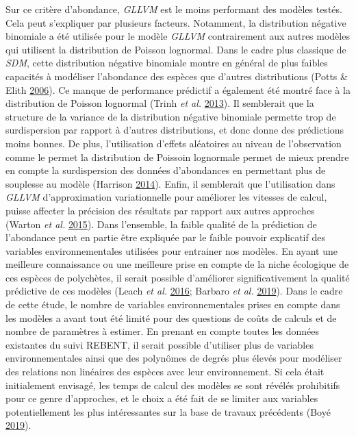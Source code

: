 \documentclass[12pt,]{article}
\begin{document}
Sur ce critère d'abondance, \emph{GLLVM} est le moins performant des
modèles testés. Cela peut s'expliquer par plusieurs facteurs. Notamment,
la distribution négative binomiale a été utilisée pour le modèle
\emph{GLLVM} contrairement aux autres modèles qui utilisent la
distribution de Poisson lognormal. Dans le cadre plus classique de
\emph{SDM}, cette distribution négative binomiale montre en général de
plus faibles capacités à modéliser l'abondance des espèces que d'autres
distributions (Potts \& Elith \protect\hyperlink{ref-Potts_2006}{2006}).
Ce manque de performance prédictif a également été montré face à la
distribution de Poisson lognormal (Trinh \emph{et al.}
\protect\hyperlink{ref-Trinh_2013}{2013}). Il semblerait que la
structure de la variance de la distribution négative binomiale permette
trop de surdispersion par rapport à d'autres distributions, et donc
donne des prédictions moins bonnes. De plus, l'utilisation d'effets
aléatoires au niveau de l'observation comme le permet la distribution de
Poissoin lognormale permet de mieux prendre en compte la surdispersion
des données d'abondances en permettant plus de souplesse au modèle
(Harrison \protect\hyperlink{ref-Harrison_2014}{2014}). Enfin, il
semblerait que l'utilisation dans \emph{GLLVM} d'approximation
variationnelle pour améliorer les vitesses de calcul, puisse affecter la
précision des résultats par rapport aux autres approches (Warton
\emph{et al.} \protect\hyperlink{ref-warton2015}{2015}). Dans
l'ensemble, la faible qualité de la prédiction de l'abondance peut en
partie être expliquée par le faible pouvoir explicatif des variables
environnementales utilisées pour entrainer nos modèles. En ayant une
meilleure connaissance ou une meilleure prise en compte de la niche
écologique de ces espèces de polychètes, il serait possible d'améliorer
significativement la qualité prédictive de ces modèles (Leach \emph{et
al.} \protect\hyperlink{ref-Leach_2016}{2016}; Barbaro \emph{et al.}
\protect\hyperlink{ref-Barbaro_2019}{2019}). Dans le cadre de cette
étude, le nombre de variables environnementales prises en compte dans
les modèles a avant tout été limité pour des questions de coûts de
calculs et de nombre de paramètres à estimer. En prenant en compte
toutes les données existantes du suivi REBENT, il serait possible
d'utiliser plus de variables environnementales ainsi que des polynômes
de degrés plus élevés pour modéliser des relations non linéaires des
espèces avec leur environnement. Si cela était initialement envisagé,
les temps de calcul des modèles se sont révélés prohibitifs pour ce
genre d'approches, et le choix a été fait de se limiter aux variables
potentiellement les plus intéressantes sur la base de travaux précédents
(Boyé \protect\hyperlink{ref-Boye_2019b}{2019}).
\end{document}
